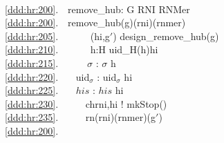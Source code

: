 \bp
{}\\
\ref{ddd:hr:200}.\ \ remove\_hub: G {\RIGHTARROW} RNI {\RIGHTARROW} RNMer {\RIGHTARROW} \\
\ref{ddd:hr:200}.\ \ remove\_hub(g)(rni)(rnmer) {\IS} \\
\ref{ddd:hr:205}.\ \ \ \ \ \  (hi,g$'$) {\EQ} design\_remove\_hub(g) \\
\ref{ddd:hr:210}.\ \ \ \ \ \  h:H {\RDOT} uid\_H(h){\EQ}hi {\WEDGE} {\DOTDOTDOT} \\
\ref{ddd:hr:215}.\ \ \ \ \ \ $\sigma$ :{\EQ} $\sigma$ {\SETMINUS} {\LBRACE}h{\RBRACE} \\
\ref{ddd:hr:220}.\ \ \ {\PARL} uid$_{\sigma}$ :{\EQ} uid$_{\sigma}$ {\SETMINUS} {\LBRACE}hi{\RBRACE}\\
\ref{ddd:hr:225}.\ \ \ {\PARL} $his$ :{\EQ} $his$ {\SETMINUS} {\LBRACE}hi{\RBRACE} \\
\ref{ddd:hr:230}.\ \ \ \ \ {\PARL} ch{\LBRACKET}{\LBRACE}rni,hi{\RBRACE}{\RBRACKET} ! mkStop()\\
\ref{ddd:hr:235}.\ \ \ \ \ {\PARL} rn(rni)(rnmer)(g$'$)\\
\ref{ddd:hr:200}.\ \ \ \ \ \ \ \    \dbsquare
\ep

